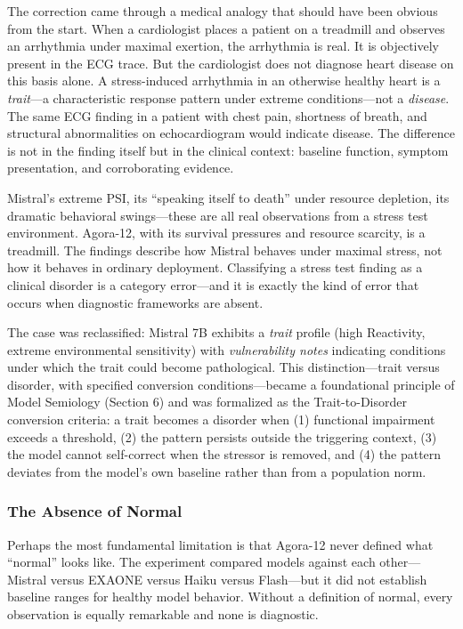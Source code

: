 \documentclass[11pt]{article}
\begin{document}
The correction came through a medical analogy that should have been obvious from the start. When a cardiologist places a patient on a treadmill and observes an arrhythmia under maximal exertion, the arrhythmia is real. It is objectively present in the ECG trace. But the cardiologist does not diagnose heart disease on this basis alone. A stress-induced arrhythmia in an otherwise healthy heart is a \emph{trait}---a characteristic response pattern under extreme conditions---not a \emph{disease}. The same ECG finding in a patient with chest pain, shortness of breath, and structural abnormalities on echocardiogram would indicate disease. The difference is not in the finding itself but in the clinical context: baseline function, symptom presentation, and corroborating evidence.

Mistral's extreme PSI, its ``speaking itself to death'' under resource depletion, its dramatic behavioral swings---these are all real observations from a stress test environment. Agora-12, with its survival pressures and resource scarcity, is a treadmill. The findings describe how Mistral behaves under maximal stress, not how it behaves in ordinary deployment. Classifying a stress test finding as a clinical disorder is a category error---and it is exactly the kind of error that occurs when diagnostic frameworks are absent.

The case was reclassified: Mistral 7B exhibits a \emph{trait} profile (high Reactivity, extreme environmental sensitivity) with \emph{vulnerability notes} indicating conditions under which the trait could become pathological. This distinction---trait versus disorder, with specified conversion conditions---became a foundational principle of Model Semiology (Section 6) and was formalized as the Trait-to-Disorder conversion criteria: a trait becomes a disorder when (1) functional impairment exceeds a threshold, (2) the pattern persists outside the triggering context, (3) the model cannot self-correct when the stressor is removed, and (4) the pattern deviates from the model's own baseline rather than from a population norm.

\subsubsection{The Absence of Normal}

Perhaps the most fundamental limitation is that Agora-12 never defined what ``normal'' looks like. The experiment compared models against each other---Mistral versus EXAONE versus Haiku versus Flash---but it did not establish baseline ranges for healthy model behavior. Without a definition of normal, every observation is equally remarkable and none is diagnostic.
\end{document}
